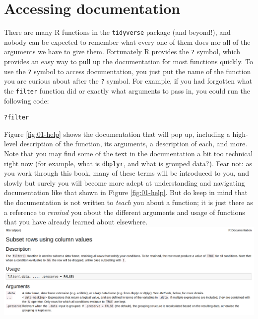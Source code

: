 \documentclass[
]{book}
\begin{document}
\hypertarget{accessing-documentation}{%
\section{Accessing documentation}\label{accessing-documentation}}

There are many R functions in the \texttt{tidyverse} package (and beyond!), and
nobody can be expected to remember what every one of them does
nor all of the arguments we have to give them. Fortunately R provides
the \texttt{?} symbol, which
 provides an easy way to pull up the documentation for
most functions quickly. To use the \texttt{?} symbol to access documentation, you
just put the name of the function you are curious about after the \texttt{?} symbol.
For example, if you had forgotten what the \texttt{filter} function
did or exactly what arguments to pass in, you could run the following
code:

\begin{verbatim}
?filter
\end{verbatim}

Figure \ref{fig:01-help} shows the documentation that will pop up,
including a high-level description of the function, its arguments,
a description of each, and more. Note that you may find some of the
text in the documentation a bit too technical right now
(for example, what is \texttt{dbplyr}, and what is grouped data?).
Fear not: as you work through this book, many of these terms will be introduced
to you, and slowly but surely you will become more adept at understanding and navigating
documentation like that shown in Figure \ref{fig:01-help}. But do keep in mind that the documentation
is not written to \emph{teach} you about a function; it is just there as a reference to \emph{remind}
you about the different arguments and usage of functions that you have already learned about elsewhere.
\includegraphics{img/help-filter.png}

  

\printindex
\end{document}
